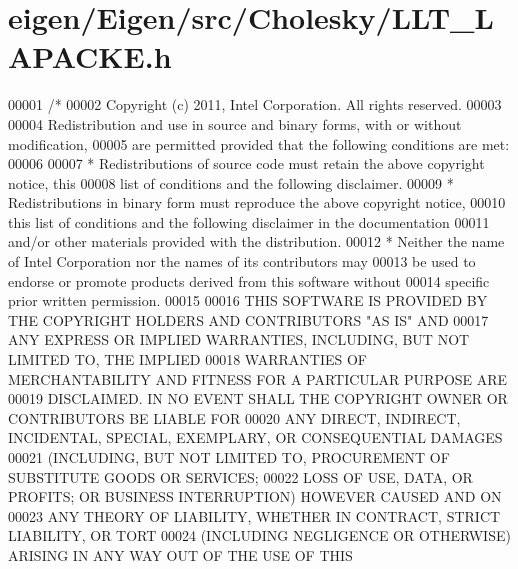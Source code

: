 \hypertarget{eigen_2_eigen_2src_2_cholesky_2_l_l_t___l_a_p_a_c_k_e_8h_source}{}\section{eigen/\+Eigen/src/\+Cholesky/\+L\+L\+T\+\_\+\+L\+A\+P\+A\+C\+KE.h}
\label{eigen_2_eigen_2src_2_cholesky_2_l_l_t___l_a_p_a_c_k_e_8h_source}

\begin{DoxyCode}
00001 \textcolor{comment}{/*}
00002 \textcolor{comment}{ Copyright (c) 2011, Intel Corporation. All rights reserved.}
00003 \textcolor{comment}{}
00004 \textcolor{comment}{ Redistribution and use in source and binary forms, with or without modification,}
00005 \textcolor{comment}{ are permitted provided that the following conditions are met:}
00006 \textcolor{comment}{}
00007 \textcolor{comment}{ * Redistributions of source code must retain the above copyright notice, this}
00008 \textcolor{comment}{   list of conditions and the following disclaimer.}
00009 \textcolor{comment}{ * Redistributions in binary form must reproduce the above copyright notice,}
00010 \textcolor{comment}{   this list of conditions and the following disclaimer in the documentation}
00011 \textcolor{comment}{   and/or other materials provided with the distribution.}
00012 \textcolor{comment}{ * Neither the name of Intel Corporation nor the names of its contributors may}
00013 \textcolor{comment}{   be used to endorse or promote products derived from this software without}
00014 \textcolor{comment}{   specific prior written permission.}
00015 \textcolor{comment}{}
00016 \textcolor{comment}{ THIS SOFTWARE IS PROVIDED BY THE COPYRIGHT HOLDERS AND CONTRIBUTORS "AS IS" AND}
00017 \textcolor{comment}{ ANY EXPRESS OR IMPLIED WARRANTIES, INCLUDING, BUT NOT LIMITED TO, THE IMPLIED}
00018 \textcolor{comment}{ WARRANTIES OF MERCHANTABILITY AND FITNESS FOR A PARTICULAR PURPOSE ARE}
00019 \textcolor{comment}{ DISCLAIMED. IN NO EVENT SHALL THE COPYRIGHT OWNER OR CONTRIBUTORS BE LIABLE FOR}
00020 \textcolor{comment}{ ANY DIRECT, INDIRECT, INCIDENTAL, SPECIAL, EXEMPLARY, OR CONSEQUENTIAL DAMAGES}
00021 \textcolor{comment}{ (INCLUDING, BUT NOT LIMITED TO, PROCUREMENT OF SUBSTITUTE GOODS OR SERVICES;}
00022 \textcolor{comment}{ LOSS OF USE, DATA, OR PROFITS; OR BUSINESS INTERRUPTION) HOWEVER CAUSED AND ON}
00023 \textcolor{comment}{ ANY THEORY OF LIABILITY, WHETHER IN CONTRACT, STRICT LIABILITY, OR TORT}
00024 \textcolor{comment}{ (INCLUDING NEGLIGENCE OR OTHERWISE) ARISING IN ANY WAY OUT OF THE USE OF THIS}

\end{DoxyCode}
